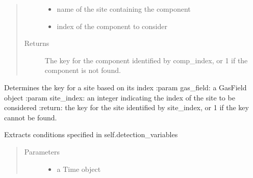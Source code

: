 \documentclass[letterpaper,10pt,english]{sphinxmanual}
\begin{document}
\begin{fulllineitems}
\begin{fulllineitems}
\begin{quote}
\begin{description}
\begin{itemize}
\item {} 
 \textendash{} name of the site containing the component

\item {} 
 \textendash{} index of the component to consider

\end{itemize}

\item[{Returns}] \leavevmode
The key for the component identified by comp\_index, or \sphinxhyphen{}1 if the component is not found.

\end{description}\end{quote}

\end{fulllineitems}


\begin{fulllineitems}
\label{\detokenize{index:feast.DetectionModules.abstract_detection_method.DetectionMethod.find_site_name}}
Determines the key for a site based on its index
:param gas\_field: a GasField object
:param site\_index: an integer indicating the index of the site to be considered
:return: the key for the site identified by site\_index, or \sphinxhyphen{}1 if the key cannot be found.

\end{fulllineitems}


\begin{fulllineitems}
\label{\detokenize{index:feast.DetectionModules.abstract_detection_method.DetectionMethod.get_current_conditions}}
Extracts conditions specified in self.detection\_variables
\begin{quote}\begin{description}
\item[{Parameters}] \leavevmode\begin{itemize}
\item {} 
 \textendash{} a Time object


\end{itemize}
\end{description}
\end{quote}
\end{fulllineitems}
\end{fulllineitems}
\end{document}
